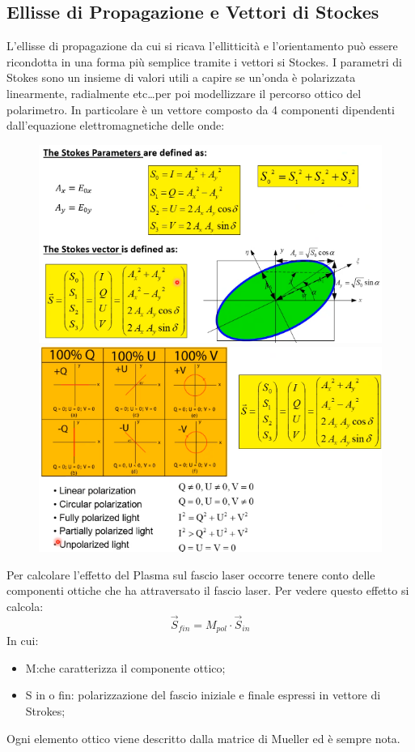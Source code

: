 \documentclass{article}
\begin{document}
\subsection{Ellisse di Propagazione e Vettori di Stockes}
L'ellisse di propagazione da cui si ricava l'ellitticità e l'orientamento può essere ricondotta in una forma più semplice tramite i vettori si Stockes. I parametri di Stokes sono un insieme di valori utili a capire se un'onda è polarizzata linearmente, radialmente etc\dots per poi modellizzare il percorso ottico del polarimetro.\newline
In particolare è un vettore composto da 4 componenti dipendenti dall'equazione elettromagnetiche delle onde:\newpage
\begin{figure}[t]
	\centering
	\includegraphics[scale=0.4]{2022-05-24-23-36-23.png}%
	\includegraphics[scale=0.4]{2022-05-24-23-38-37.png}%
\end{figure}
Per calcolare l'effetto del Plasma sul fascio laser occorre tenere conto delle componenti ottiche che ha attraversato il fascio laser. Per vedere questo effetto si calcola:
\begin{equation}
	\overrightarrow{S}_{fin}=M_{pol}\cdot \overrightarrow{S}_{in}
\end{equation}
In cui:\begin{itemize}
	\item M:\@matrice che caratterizza il componente ottico;
	\item S in o fin: polarizzazione del fascio iniziale e finale espressi in vettore di Strokes;
\end{itemize}
Ogni elemento ottico viene descritto dalla matrice di Mueller ed è sempre nota.
\end{document}

